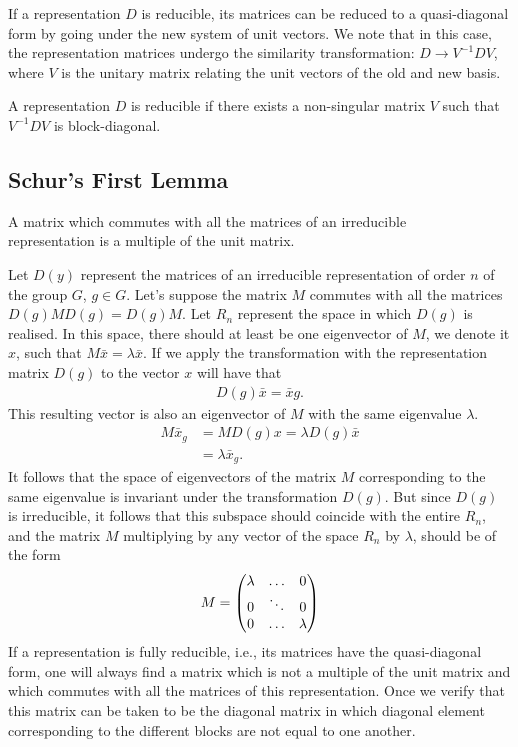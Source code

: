 If a representation $D$ is reducible, its matrices can be reduced to a
quasi-diagonal form by going under the new system of unit vectors.
We note that in this case, the representation matrices undergo the similarity
transformation: $D\rightarrow V^{-1}DV$, where $V$ is the unitary matrix relating
the unit vectors of the old and new basis.

A representation $D$ is reducible if there exists a non-singular matrix $V$
such that $V^{-1}DV$ is block-diagonal.

\subsection{Schur's First Lemma} %
\label{sub:Schur's First Lemma}

\begin{epigraph}
    A matrix which commutes with all the matrices of an irreducible\\
    representation is a multiple of the unit matrix.
\end{epigraph}

Let $D(y)$ represent the matrices of an irreducible representation of order $n$
of the group $G$, $g\in G$. Let's suppose the matrix $M$ commutes with all the
matrices  $D(g)MD(g)=D(g)M$. Let $R_n$ represent the space in which $D(g)$ is
realised. In this space, there should at least be one eigenvector of $M$, we
denote it $x$, such that $M\bar{x}=\lambda\bar{x}$. If we apply the transformation with the representation matrix $D(g)$ to the vector $x$ will have that
\begin{align}
    D(g)\bar{x}=\bar{x}g.
\end{align}
This resulting vector is also an eigenvector of $M$ with the same eigenvalue
$\lambda$.
\begin{align}
    M\bar{x}_g&=MD(g)x=\lambda D(g)\bar{x}\\
              &=\lambda\bar{x}_g.
\end{align}
It follows that the space of eigenvectors of the matrix $M$ corresponding to
the same eigenvalue is invariant under the transformation $D(g)$. But since $D(g)$
is irreducible, it follows that this subspace should coincide with the entire
$R_n$, and the matrix $M$ multiplying by any vector of the space $R_n$ by
$\lambda$, should be of the form
\begin{align}
    M=\mqty(\lambda&\dots&0\\0&\ddots&0\\0&\dots&\lambda)
\end{align}
If a representation is fully reducible, i.e., its matrices have the quasi-diagonal
form, one will always find a matrix which is not a multiple of the unit matrix
and which commutes with all the matrices of this representation. Once we verify
that this matrix can be taken to be the diagonal matrix in which diagonal element
corresponding to the different blocks are not equal to one another.

